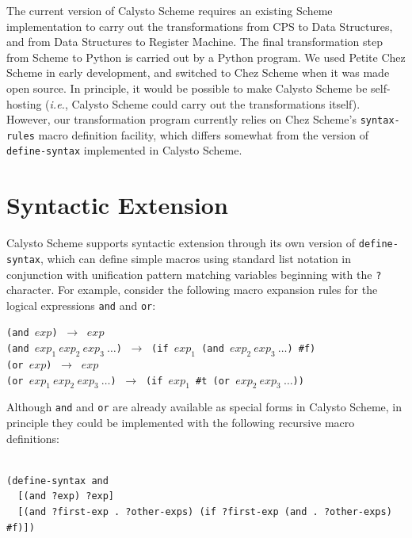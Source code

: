 \documentclass[acmsmall,screen,authorversion]{acmart}
\begin{document}
The current version of Calysto Scheme requires an existing Scheme
implementation to carry out the transformations from CPS to Data Structures,
and from Data Structures to Register Machine.  The final transformation step
from Scheme to Python is carried out by a Python program.  We used Petite Chez
Scheme in early development, and switched to Chez Scheme when it was made open
source. In principle, it would be possible to make Calysto Scheme be
self-hosting (\emph{i.e.}, Calysto Scheme could carry out the transformations
itself). However, our transformation program currently relies on Chez Scheme's
\texttt{syntax-rules} macro definition facility, which differs somewhat from
the version of \texttt{define-syntax} implemented in Calysto Scheme.


\section{Syntactic Extension}

\noindent
Calysto Scheme supports syntactic extension through its own version of
\texttt{define-syntax}, which can define simple macros using standard list
notation in conjunction with unification pattern matching variables beginning
with the \texttt{?} character.  For example, consider the following macro
expansion rules for the logical expressions \texttt{and} and \texttt{or}:\\

\begin{minipage}{\textwidth}
\texttt{(and $\mathit{exp}$)} $~\rightarrow~$ $\mathit{exp}$\\
\texttt{(and $\mathit{exp}_1~\mathit{exp}_2~\mathit{exp}_3~\ldots$)} $~\rightarrow~$
\texttt{(if $\mathit{exp}_1$ (and $\mathit{exp}_2~\mathit{exp}_3~\ldots$) \#f)}\\

\texttt{(or $\mathit{exp}$)} $~\rightarrow~$ $\mathit{exp}$\\
\texttt{(or $\mathit{exp}_1~\mathit{exp}_2~\mathit{exp}_3~\ldots$)} $~\rightarrow~$
\texttt{(if $\mathit{exp}_1$ \#t (or $\mathit{exp}_2~\mathit{exp}_3~\ldots$))}\\
\end{minipage}

\noindent
Although \texttt{and} and \texttt{or} are already available as special forms in
Calysto Scheme, in principle they could be implemented with the following
recursive macro definitions:\\

\begin{minipage}{\textwidth}
\begin{verbatim}

(define-syntax and
  [(and ?exp) ?exp]
  [(and ?first-exp . ?other-exps) (if ?first-exp (and . ?other-exps) #f)])

\end{verbatim}
\end{minipage}
\end{document}
